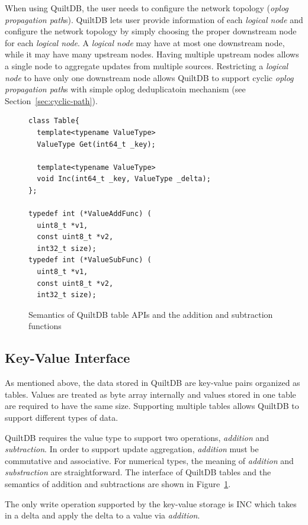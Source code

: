 \documentclass[11pt, twocolumn]{article}
\begin{document}
When using QuiltDB, the user needs to configure the network topology
(\emph{oplog propagation path}s). QuiltDB lets user provide information of
each \emph{logical node} and configure the network topology by simply choosing
the proper downstream node for each \emph{logical node}. A \emph{logical node}
may have at most one downstream node, while it may have many upstream nodes.
Having multiple upstream nodes allows a single node to aggregate updates from
multiple sources. Restricting a \emph{logical node} to have only one downstream
node allows QuiltDB to support cyclic \emph{oplog propagation path}s with simple
oplog deduplicatoin mechanism (see Section~\ref{sec:cyclic-path}).


\begin{figure}[th!]
\begin{verbatim}
class Table{
  template<typename ValueType>
  ValueType Get(int64_t _key);

  template<typename ValueType>
  void Inc(int64_t _key, ValueType _delta);
};

typedef int (*ValueAddFunc) (
  uint8_t *v1,
  const uint8_t *v2,
  int32_t size);
typedef int (*ValueSubFunc) (
  uint8_t *v1,
  const uint8_t *v2,
  int32_t size);
\end{verbatim}
\caption{Semantics of QuiltDB table APIs and the addition and subtraction
  functions}
\label{fig:table-api}
\end{figure}

\subsection{Key-Value Interface}

As mentioned above, the data stored in QuiltDB are key-value pairs organized
as tables. Values are treated as byte array internally and values stored in one
table are required to have the same size. Supporting multiple tables allows
QuiltDB to support different types of data.

QuiltDB requires the value type to support two operations, \emph{addition} and
\emph{subtraction}. In order to support update aggregation, \emph{addition} must
 be commutative and associative. For numerical types,  the meaning of
\emph{addition} and \emph{substraction} are straightforward. The interface of
QuiltDB tables and the semantics of addition and subtractions are shown in
Figure~\ref{fig:table-api}.

The only write operation supported by the key-value storage is INC which takes
in a delta and apply the delta to a value via \emph{addition}.
\end{document}
